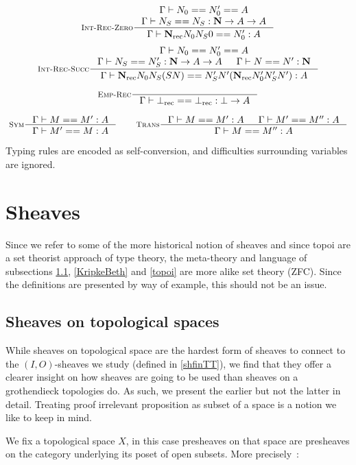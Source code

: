 \documentclass[11pt]{article}
\DeclareMathOperator{\rec}{rec}
\newcommand{\0}{\mathbf{0}}
\newcommand{\1}{\mathbf{1}}
\newcommand{\nat}{\mathbf{N}}
\newcommand{\tctx}{\Gamma}
\begin{document}
$$
    \inference[\textsc{Int-Rec-Zero}]{\tctx |- N_0 == N'_0 == A\\ \tctx |- N_S == N_S : \nat -> A  -> A}{\tctx |- \nat_{\rec} N_0N_S0 == N'_0 : A}
$$
$$
    \inference[\textsc{Int-Rec-Succ}]{\tctx |- N_0 == N'_0 == A\\ \tctx |- N_S == N'_S : \nat -> A  -> A & \tctx |- N == N' :\nat}{\tctx |- \nat_{\rec} N_0N_S (S N) == N'_S N' (\nat_{\rec}N'_0 N'_S N') : A}
$$


$$
    \inference[\textsc{Emp-Rec}]{}{\tctx |- \bot_{\rec} == \bot_{\rec} : \bot -> A}
$$

$$
    \inference[\textsc{Sym}]{\tctx |- M == M' : A}{\tctx |- M' == M : A} \qquad
    \inference[\textsc{Trans}]
    {\tctx |- M == M' :A & \tctx |- M' == M'' : A}{\tctx |- M == M'' : A}
$$

Typing rules are encoded as self-conversion, and difficulties surrounding variables are ignored.

\section{Sheaves}\label{Sheaves}

Since we refer to some of the more historical notion of sheaves and since topoi are a set theorist approach of type theory, the meta-theory and language of subsections \ref{topsheaves}, \ref{KripkeBeth} and  \ref{topoi} are more alike set theory (ZFC).
Since the definitions are presented by way of example, this should not be an issue.

\subsection{Sheaves on topological spaces}\label{topsheaves}

While sheaves on topological space are the hardest form of sheaves to connect to the $(I,O)$-sheaves we study (defined in \ref{shfinTT}), we find that they offer a clearer insight on how sheaves are going to be used than sheaves on a grothendieck topologies do.
As such, we present the earlier but not the latter in detail.
Treating proof irrelevant proposition as subset of a space is a notion we like to keep in mind.

We fix a topological space $X$, in this case presheaves on that space are presheaves on the category underlying its poset of open subsets. More precisely~:
\end{document}
